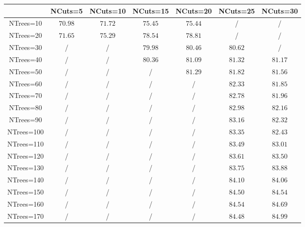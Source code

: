 \centering
\begin{tabular}{|c|c|c|c|c|c|c|} \hline
 & NCuts=5 & NCuts=10 & NCuts=15 & NCuts=20 & NCuts=25 & NCuts=30\\\hline
NTrees=10 & $70.98$ & $71.72$ & $75.45$ & $75.44$ &  / &  /\\\hline
NTrees=20 & $71.65$ & $75.29$ & $78.54$ & $78.81$ &  / &  /\\\hline
NTrees=30 &  / &  / & $79.98$ & $80.46$ & $80.62$ &  /\\\hline
NTrees=40 &  / &  / & $80.36$ & $81.09$ & $81.32$ & $81.17$\\\hline
NTrees=50 &  / &  / &  / & $81.29$ & $81.82$ & $81.56$\\\hline
NTrees=60 &  / &  / &  / &  / & $82.33$ & $81.85$\\\hline
NTrees=70 &  / &  / &  / &  / & $82.78$ & $81.96$\\\hline
NTrees=80 &  / &  / &  / &  / & $82.98$ & $82.16$\\\hline
NTrees=90 &  / &  / &  / &  / & $83.16$ & $82.32$\\\hline
NTrees=100 &  / &  / &  / &  / & $83.35$ & $82.43$\\\hline
NTrees=110 &  / &  / &  / &  / & $83.49$ & $83.01$\\\hline
NTrees=120 &  / &  / &  / &  / & $83.61$ & $83.50$\\\hline
NTrees=130 &  / &  / &  / &  / & $83.75$ & $83.88$\\\hline
NTrees=140 &  / &  / &  / &  / & $84.10$ & $84.06$\\\hline
NTrees=150 &  / &  / &  / &  / & $84.50$ & $84.54$\\\hline
NTrees=160 &  / &  / &  / &  / & $84.54$ & $84.69$\\\hline
NTrees=170 &  / &  / &  / &  / & $84.48$ & $84.99$\\\hline
\end{tabular}
